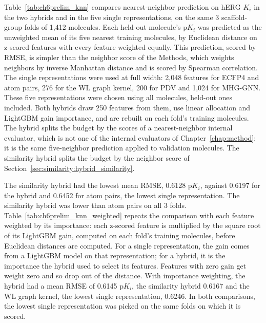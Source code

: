 Table~\ref{tab:ch6prelim_knn} compares nearest-neighbor prediction on hERG $K_i$ in the two hybrids and in the five single representations, on the same 3 scaffold-group folds of 1,412 molecules. Each held-out molecule's p$K_i$ was predicted as the unweighted mean of its five nearest training molecules, by Euclidean distance on z-scored features with every feature weighted equally. This prediction, scored by RMSE, is simpler than the neighbor score of the Methods, which weights neighbors by inverse Manhattan distance and is scored by Spearman correlation. The single representations were used at full width: 2,048 features for ECFP4 and atom pairs, 276 for the WL graph kernel, 200 for PDV and 1,024 for MHG-GNN. These five representations were chosen using all molecules, held-out ones included. Both hybrids draw 250 features from them, use linear allocation and LightGBM gain importance, and are rebuilt on each fold's training molecules. The hybrid splits the budget by the scores of a nearest-neighbor internal evaluator, which is not one of the internal evaluators of Chapter~\ref{chap:method}; it is the same five-neighbor prediction applied to validation molecules. The similarity hybrid splits the budget by the neighbor score of Section~\ref{sec:similarity:hybrid_similarity}.

The similarity hybrid had the lowest mean RMSE, 0.6128 p$K_i$, against 0.6197 for the hybrid and 0.6452 for atom pairs, the lowest single representation. The similarity hybrid was lower than atom pairs on all 3 folds. Table~\ref{tab:ch6prelim_knn_weighted} repeats the comparison with each feature weighted by its importance: each z-scored feature is multiplied by the square root of its LightGBM gain, computed on each fold's training molecules, before Euclidean distances are computed. For a single representation, the gain comes from a LightGBM model on that representation; for a hybrid, it is the importance the hybrid used to select its features. Features with zero gain get weight zero and so drop out of the distance. With importance weighting, the hybrid had a mean RMSE of 0.6145 p$K_i$, the similarity hybrid 0.6167 and the WL graph kernel, the lowest single representation, 0.6246. In both comparisons, the lowest single representation was picked on the same folds on which it is scored.


